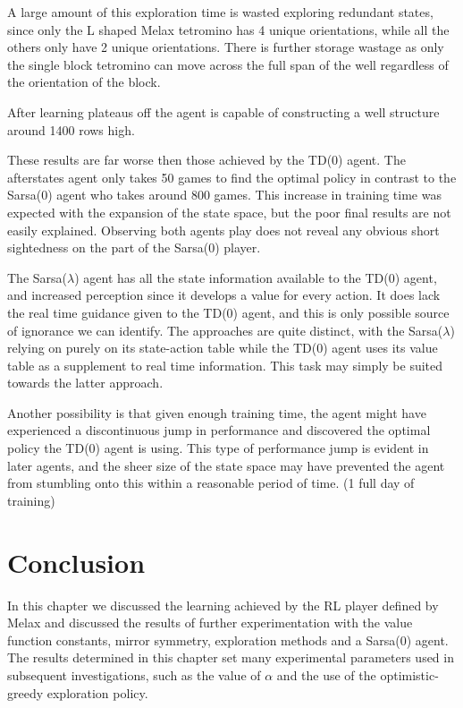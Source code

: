 \documentclass{rucsthesis}
\begin{document}
A large amount of this exploration time is wasted exploring redundant states, since only the L shaped Melax tetromino has 4 unique orientations, while all the others only have 2 unique orientations. There is further storage wastage as only the single block tetromino can move across the full span of the well regardless of the orientation of the block. 

After learning plateaus off the agent is capable of constructing a well structure around 1400 rows high. 

These results are far worse then those achieved by the TD(0) agent. The afterstates agent only takes 50 games to find the optimal policy in contrast to the Sarsa(0) agent who takes around 800 games. This increase in training time was expected with the expansion of the state space, but the poor final results are not easily explained. Observing both agents play does not reveal any obvious short sightedness on the part of the Sarsa(0) player.

The Sarsa($\lambda$) agent has all the state information available to the TD(0) agent, and increased perception since it develops a value for every action. It does lack the real time guidance given to the TD(0) agent, and this is only possible source of ignorance we can identify. The approaches are quite distinct, with the Sarsa($\lambda$) relying on purely on its state-action table while the TD(0) agent uses its value table as a supplement to real time information. This task may simply be suited towards the latter approach.

Another possibility is that given enough training time, the agent might have experienced a discontinuous jump in performance and discovered the optimal policy the TD(0) agent is using. This type of performance jump is evident in later agents, and the sheer size of the state space may have prevented the agent from stumbling onto this within a reasonable period of time. (1 full day of training)

\section{Conclusion}

In this chapter we discussed the learning achieved by the RL player defined by Melax and discussed the results of further experimentation with the value function constants, mirror symmetry, exploration methods and a Sarsa(0) agent. The results determined in this chapter set many experimental parameters used in subsequent investigations, such as the value of $\alpha$ and the use of the optimistic-greedy exploration policy.
\end{document}
